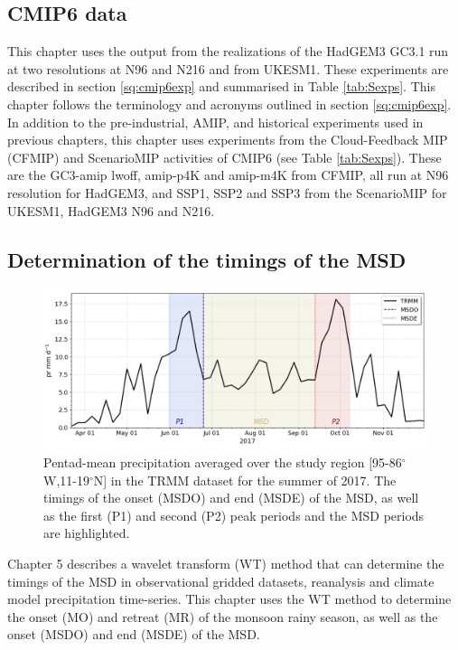 \subsection{CMIP6 data}

This chapter uses the output from the realizations of the HadGEM3 GC3.1 run at two resolutions at N96 and N216 and from UKESM1. These experiments are described in section \ref{sq:cmip6exp} and summarised in Table \ref{tab:Sexps}. This chapter follows the terminology and acronyms outlined in section \ref{sq:cmip6exp}. In addition to the pre-industrial, AMIP, and historical experiments used in previous chapters, this chapter uses experiments from the Cloud-Feedback MIP (CFMIP) \citep{webb2017} and ScenarioMIP \citep{o2016} activities of CMIP6 (see Table \ref{tab:Sexps}). These are the GC3-amip lwoff, amip-p4K and amip-m4K from CFMIP, all run at N96 resolution for HadGEM3, and SSP1, SSP2 and SSP3 from the ScenarioMIP for UKESM1, HadGEM3 N96 and N216.

\subsection{Determination of the timings of the MSD}

 \begin{figure}[t!]
\includegraphics[width=\linewidth]{figures/explain_fig_msd.png}
\caption[Illustration of the use of the wavelet transform method]{Pentad-mean precipitation averaged over the study region [95-86$^\circ$W,11-19$^\circ$N] in the TRMM dataset for the summer of 2017. The timings of the onset (MSDO) and end (MSDE) of the MSD, as well as the first (P1) and second (P2) peak periods and the MSD periods are highlighted. }
\label{fig:explain_msd}
\end{figure}

Chapter 5 describes a wavelet transform (WT) method that can determine the timings of the MSD in observational gridded datasets, reanalysis and climate model precipitation time-series. 
This chapter uses the WT method to determine the onset (MO) and retreat (MR) of the monsoon rainy season, as well as the onset  (MSDO) and end (MSDE) of the MSD. 

